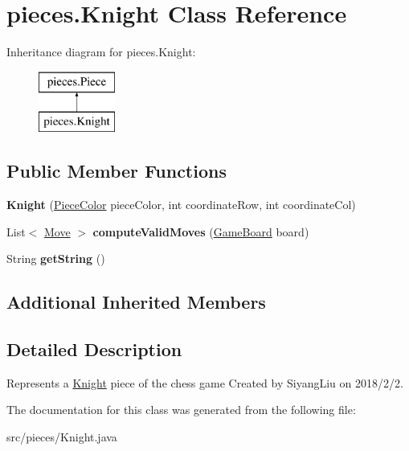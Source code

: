 \hypertarget{classpieces_1_1_knight}{}\section{pieces.\+Knight Class Reference}
\label{classpieces_1_1_knight}
Inheritance diagram for pieces.\+Knight\+:\begin{figure}[H]
\begin{center}
\leavevmode
\includegraphics[height=2.000000cm]{classpieces_1_1_knight}
\end{center}
\end{figure}
\subsection*{Public Member Functions}
\begin{DoxyCompactItemize}
\item 
\mbox{\label{classpieces_1_1_knight_a35623250e05bc6baac22f422c59bea94}} 
{\bfseries Knight} (\mbox{\hyperlink{enumpieces_1_1_piece_1_1_piece_color}{Piece\+Color}} piece\+Color, int coordinate\+Row, int coordinate\+Col)
\item 
\mbox{\label{classpieces_1_1_knight_abe3bc9be7e1103cd1ba2ea1cae18a290}} 
List$<$ \mbox{\hyperlink{classpieces_1_1_move}{Move}} $>$ {\bfseries compute\+Valid\+Moves} (\mbox{\hyperlink{classgameboard_1_1_game_board}{Game\+Board}} board)
\item 
\mbox{\label{classpieces_1_1_knight_a9401a10578ca96dd0cc066195d7bb8fe}} 
String {\bfseries get\+String} ()
\end{DoxyCompactItemize}
\subsection*{Additional Inherited Members}


\subsection{Detailed Description}
Represents a \mbox{\hyperlink{classpieces_1_1_knight}{Knight}} piece of the chess game Created by Siyang\+Liu on 2018/2/2. 

The documentation for this class was generated from the following file\+:\begin{DoxyCompactItemize}
\item 
src/pieces/Knight.\+java\end{DoxyCompactItemize}
